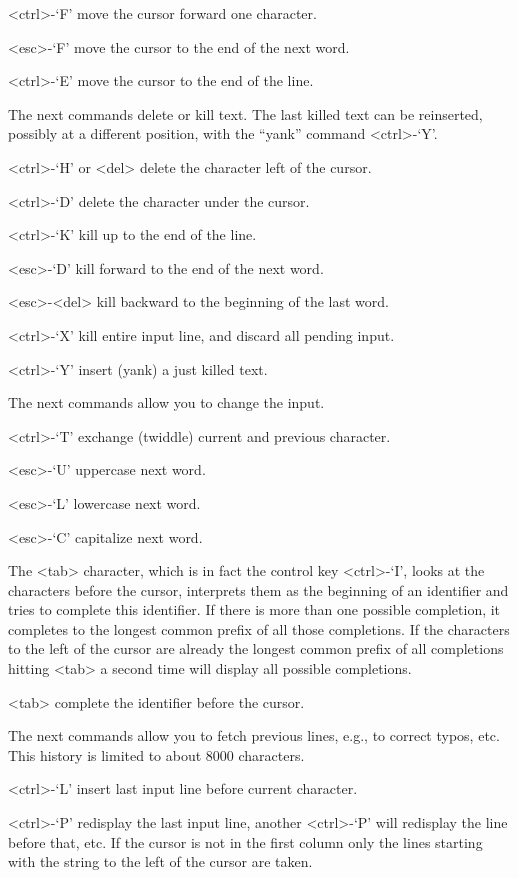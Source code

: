 <ctrl>-`F' move the cursor forward one character. 

<esc>-`F' move the cursor to the end of the next word. 

<ctrl>-`E' move the cursor to the end of the line.

The next commands delete or kill text.
The last killed text can be reinserted, possibly at a different position,
with the ``yank'' command <ctrl>-`Y'.

<ctrl>-`H' or <del> delete the character left of the cursor. 

<ctrl>-`D' delete the character under the cursor. 

<ctrl>-`K' kill up to the end of the line. 

<esc>-`D' kill forward to the end of the next word. 

<esc>-<del> kill backward to the beginning of the last word. 

<ctrl>-`X' kill entire input line, and discard all pending input. 

<ctrl>-`Y' insert (yank) a just killed text.

The next commands allow you to change the input.

<ctrl>-`T' exchange (twiddle) current and previous character. 

<esc>-`U' uppercase next word. 

<esc>-`L' lowercase next word. 

<esc>-`C' capitalize next word.

The <tab> character, which is in fact the control key <ctrl>-`I', looks at
the characters before the cursor, interprets them as the beginning of an
identifier and tries to complete this identifier. If there is more than
one possible completion, it completes to the longest common prefix of all
those completions. If the characters to the left of the cursor are
already the longest common prefix of all completions hitting <tab> a
second time will display all possible completions.

<tab>  complete the identifier before the cursor.

The next commands allow you to fetch previous lines, e.g., to correct
typos, etc. This history is limited to about 8000 characters.

<ctrl>-`L' insert last input line before current character.

<ctrl>-`P' redisplay the last input line, another <ctrl>-`P' will
  redisplay the line before that, etc. If the cursor is
  not in the first column only the lines starting with the
  string to the left of the cursor are taken.

